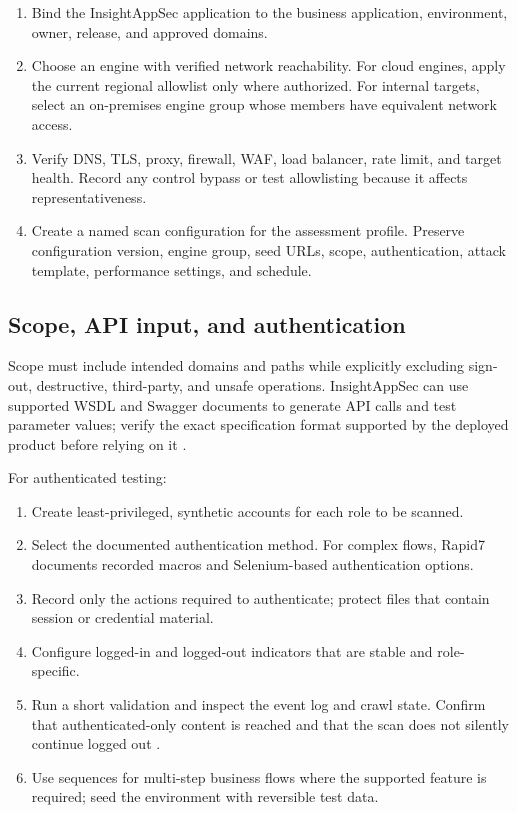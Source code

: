 \documentclass[11pt,letterpaper]{article}
\begin{document}
\begin{enumerate}
  \item Bind the InsightAppSec application to the business application, environment, owner, release, and approved domains.
  \item Choose an engine with verified network reachability. For cloud engines, apply the current regional allowlist only where authorized. For internal targets, select an on-premises engine group whose members have equivalent network access.
  \item Verify DNS, TLS, proxy, firewall, WAF, load balancer, rate limit, and target health. Record any control bypass or test allowlisting because it affects representativeness.
  \item Create a named scan configuration for the assessment profile. Preserve configuration version, engine group, seed URLs, scope, authentication, attack template, performance settings, and schedule.
\end{enumerate}

\subsection{Scope, API input, and authentication}

Scope must include intended domains and paths while explicitly excluding sign-out, destructive, third-party, and unsafe operations. InsightAppSec can use supported WSDL and Swagger documents to generate API calls and test parameter values; verify the exact specification format supported by the deployed product before relying on it \citep{rapid7scope}.

For authenticated testing:

\begin{enumerate}
  \item Create least-privileged, synthetic accounts for each role to be scanned.
  \item Select the documented authentication method. For complex flows, Rapid7 documents recorded macros and Selenium-based authentication options.
  \item Record only the actions required to authenticate; protect files that contain session or credential material.
  \item Configure logged-in and logged-out indicators that are stable and role-specific.
  \item Run a short validation and inspect the event log and crawl state. Confirm that authenticated-only content is reached and that the scan does not silently continue logged out \citep{rapid7auth}.
  \item Use sequences for multi-step business flows where the supported feature is required; seed the environment with reversible test data.
\end{enumerate}
\end{document}
